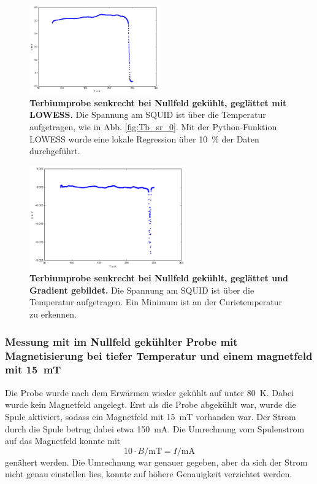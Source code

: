 \documentclass[a4paper,ngerman]{scrartcl}
\begin{document}
\begin{figure}
\centering
\includegraphics[width=0.5\textwidth]{abbildungen/Tb_sr_0_glatt.png}
\caption[Terbiumprobe senkrecht bei Nullfeld]{\textbf{Terbiumprobe senkrecht bei Nullfeld gekühlt, geglättet mit LOWESS.} Die Spannung am SQUID ist über die Temperatur aufgetragen, wie in Abb. \ref{fig:Tb_sr_0}. Mit der Python-Funktion LOWESS wurde eine lokale Regression über 10~\% der Daten durchgeführt.}
\label{fig:Tb_sr_0_glatt}
\end{figure}


\begin{figure}
\centering
\includegraphics[width=0.6\textwidth]{abbildungen/Tb_sr_0_grad.png}
\caption[Terbiumprobe senkrecht bei Nullfeld]{\textbf{Terbiumprobe senkrecht bei Nullfeld gekühlt, geglättet und Gradient gebildet.} Die Spannung am SQUID ist über die Temperatur aufgetragen. Ein Minimum ist an der Curietemperatur zu erkennen.}
\label{fig:Tb_sr_0_grad}
\end{figure}

\subsubsection*{Messung mit im Nullfeld gekühlter Probe mit Magnetisierung bei tiefer Temperatur und einem magnetfeld mit \SI{15}{mT}}

Die Probe wurde nach dem Erwärmen wieder gekühlt auf unter \SI{80}{K}.
Dabei wurde kein Magnetfeld angelegt.
Erst als die Probe abgekühlt war, wurde die Spule aktiviert, sodass ein Magnetfeld mit \SI{15}{mT} vorhanden war.
Der Strom durch die Spule betrug dabei etwa \SI{150}{\mA}.
Die Umrechnung vom Spulenstrom auf das Magnetfeld konnte mit 
\begin{equation}
10 \cdot B/\mathrm{mT} = I /\mathrm{mA}
\end{equation} 
genähert werden. 
Die Umrechnung war genauer gegeben, aber da sich der Strom nicht genau einstellen lies, konnte auf höhere Genauigkeit verzichtet werden.
\end{document}
